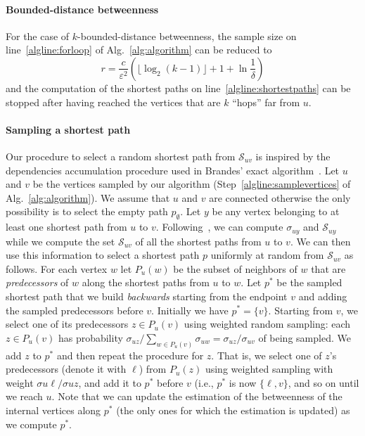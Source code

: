 \ifproof
\else
\paragraph{Bounded-distance betweenness} For the case of
$k$-bounded-distance betweenness, the sample size on line~\ref{algline:forloop}
of Alg.~\ref{alg:algorithm} can be reduced to 
\[ 
  r= \frac{c}{\varepsilon^2}\left(\lfloor\log_2(k-1)\rfloor + 1 +\ln\frac{1}{\delta}\right)
\]
and the computation of the shortest paths on line~\ref{algline:shortestpaths}
can be stopped after having reached the vertices that are $k$ ``hops'' far from $u$.
\fi

\paragraph{Sampling a shortest path}
Our procedure to select a random shortest path from $\mathcal{S}_{uv}$ is
inspired by the dependencies accumulation procedure used in Brandes' exact
algorithm~\citep{Brandes01}. 
Let $u$ and $v$ be the vertices sampled by our algorithm
(Step~\ref{algline:samplevertices} of Alg.~\ref{alg:algorithm}). We assume that $u$ and
$v$ are connected otherwise the only possibility is to select the empty path
$p_\emptyset$. Let $y$ be any vertex belonging to at least one shortest path
from $u$ to $v$. Following~\citet{Brandes01}, we can compute $\sigma_{uy}$ and
$\mathcal{S}_{uy}$ while we compute the set $\mathcal{S}_{uv}$ of all the
shortest paths from $u$ to $v$. We can then use this information to select a
shortest path $p$ uniformly at random from $\mathcal{S}_{uv}$ as follows. For
each vertex $w$ let $P_u(w)$ be the subset of neighbors of $w$ that are
\emph{predecessors} of $w$ along the shortest paths from $u$ to $w$. Let $p^*$
be the sampled shortest path that we build \emph{backwards} starting from the endpoint
$v$ and adding the sampled predecessors before ${v}$. Initially we have $p^*=\{v\}$. Starting
from $v$, we select one of its predecessors $z\in P_u(v)$ using weighted random
sampling: each $z\in P_u(v)$ has probability $\sigma_{uz}/\sum_{w\in
P_u(v)}\sigma_{uw}=\sigma_{uz}/\sigma_{uv}$ of being sampled. We add $z$ to
$p^*$ and then repeat the procedure for $z$. That is, we select one of $z$'s
predecessors (denote it with $\ell$) from $P_u(z)$ using weighted sampling with
weight $\sigma{u\ell}/\sigma{uz}$, and add it to $p^*$ before $v$ (i.e., $p^*$
is now $\{\ell, v\}$, and so on until we reach $u$. Note that we
can update the estimation of the betweenness of the internal vertices along
$p^*$ (the only ones for which the estimation is updated) as we compute $p^*$.

